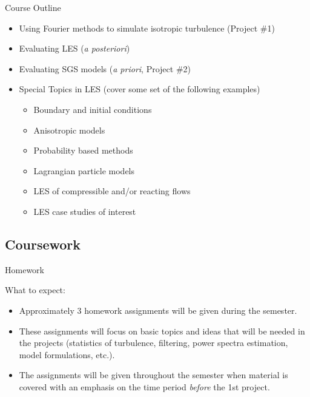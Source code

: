 
\begin{frame}{Course Outline}
\begin{itemize}
\item Using Fourier methods to simulate isotropic turbulence (Project \#1)
\item Evaluating LES (\textit{a posteriori})
\item Evaluating SGS models (\textit{a priori}, Project \#2)
\item Special Topics in LES (cover some set of the following examples)
\begin{itemize}
\item Boundary and initial conditions
\item Anisotropic models
\item Probability based methods
\item Lagrangian particle models
\item LES of compressible and/or reacting flows
\item LES case studies of interest
\end{itemize}
\end{itemize}
\end{frame}


\subsection{Coursework}
\begin{frame}{Homework}

What to expect:
\begin{itemize}
\item Approximately 3 homework assignments will be given during the semester. 
\item These assignments will focus on basic topics and ideas that will be needed in the projects (statistics of turbulence, filtering, power spectra estimation, model formulations, etc.). 
\item The assignments will be given throughout the semester when material is covered with an emphasis on the time period \textit{before} the 1st project.
\end{itemize}
\end{frame}


